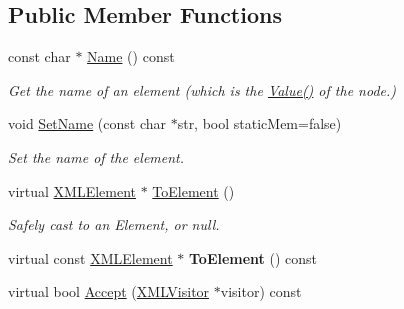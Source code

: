 \subsection*{Public Member Functions}
\begin{DoxyCompactItemize}
\item 
\mbox{\label{classtinyxml2_1_1_x_m_l_element_a63e057fb5baee1dd29f323cb85907b35}} 
const char $\ast$ \mbox{\hyperlink{classtinyxml2_1_1_x_m_l_element_a63e057fb5baee1dd29f323cb85907b35}{Name}} () const
\begin{DoxyCompactList}\small\item\em Get the name of an element (which is the \mbox{\hyperlink{classtinyxml2_1_1_x_m_l_node_a0485e51c670e741884cfd8362274d680}{Value()}} of the node.) \end{DoxyCompactList}\item 
\mbox{\label{classtinyxml2_1_1_x_m_l_element_a97712009a530d8cb8a63bf705f02b4f1}} 
void \mbox{\hyperlink{classtinyxml2_1_1_x_m_l_element_a97712009a530d8cb8a63bf705f02b4f1}{Set\+Name}} (const char $\ast$str, bool static\+Mem=false)
\begin{DoxyCompactList}\small\item\em Set the name of the element. \end{DoxyCompactList}\item 
\mbox{\label{classtinyxml2_1_1_x_m_l_element_ad9ff5c2dbc15df36cf664ce1b0ea0a5d}} 
virtual \mbox{\hyperlink{classtinyxml2_1_1_x_m_l_element}{X\+M\+L\+Element}} $\ast$ \mbox{\hyperlink{classtinyxml2_1_1_x_m_l_element_ad9ff5c2dbc15df36cf664ce1b0ea0a5d}{To\+Element}} ()
\begin{DoxyCompactList}\small\item\em Safely cast to an Element, or null. \end{DoxyCompactList}\item 
\mbox{\label{classtinyxml2_1_1_x_m_l_element_afeb353047ab8532191709dcaef07337e}} 
virtual const \mbox{\hyperlink{classtinyxml2_1_1_x_m_l_element}{X\+M\+L\+Element}} $\ast$ {\bfseries To\+Element} () const
\item 
virtual bool \mbox{\hyperlink{classtinyxml2_1_1_x_m_l_element_a9b2119831e8b85827d5d3e5076788e4a}{Accept}} (\mbox{\hyperlink{classtinyxml2_1_1_x_m_l_visitor}{X\+M\+L\+Visitor}} $\ast$visitor) const

\end{DoxyCompactItemize}
